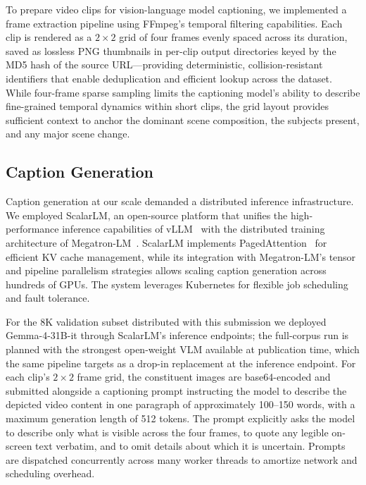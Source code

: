 \documentclass{article}
\begin{document}
To prepare video clips for vision-language model captioning, we implemented a frame extraction pipeline using FFmpeg's temporal filtering capabilities. Each clip is rendered as a $2 \times 2$ grid of four frames evenly spaced across its duration, saved as lossless PNG thumbnails in per-clip output directories keyed by the MD5 hash of the source URL---providing deterministic, collision-resistant identifiers that enable deduplication and efficient lookup across the dataset. While four-frame sparse sampling limits the captioning model's ability to describe fine-grained temporal dynamics within short clips, the grid layout provides sufficient context to anchor the dominant scene composition, the subjects present, and any major scene change.

\subsection{Caption Generation}
\label{app:caption-generation}

Caption generation at our scale demanded a distributed inference infrastructure. We employed ScalarLM, an open-source platform that unifies the high-performance inference capabilities of vLLM~\cite{kwon2023efficient} with the distributed training architecture of Megatron-LM~\cite{shoeybi2019megatron, narayanan2021efficient}. ScalarLM implements PagedAttention~\cite{kwon2023efficient} for efficient KV cache management, while its integration with Megatron-LM's tensor and pipeline parallelism strategies allows scaling caption generation across hundreds of GPUs. The system leverages Kubernetes for flexible job scheduling and fault tolerance.

For the 8K validation subset distributed with this submission we deployed Gemma-4-31B-it through ScalarLM's inference endpoints; the full-corpus run is planned with the strongest open-weight VLM available at publication time, which the same pipeline targets as a drop-in replacement at the inference endpoint. For each clip's $2 \times 2$ frame grid, the constituent images are base64-encoded and submitted alongside a captioning prompt instructing the model to describe the depicted video content in one paragraph of approximately 100--150 words, with a maximum generation length of 512 tokens. The prompt explicitly asks the model to describe only what is visible across the four frames, to quote any legible on-screen text verbatim, and to omit details about which it is uncertain. Prompts are dispatched concurrently across many worker threads to amortize network and scheduling overhead.
\end{document}
